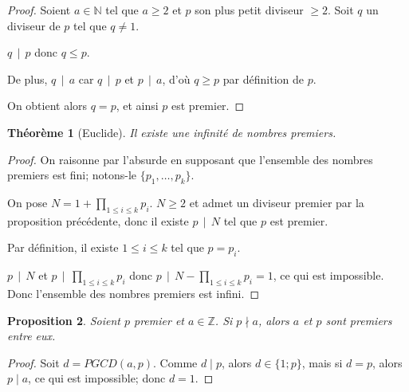 \documentclass[10pt,a4paper]{report}
\newtheorem{thm}{Théorème}[chapter]
\newtheorem*{rem}{Remarque}
\newtheorem{Prop}[thm]{Proposition}
\begin{document}
\begin{proof}
Soient $a \in \mathbb{N}$ tel que $a \geqslant 2$ et $p$ son plus petit diviseur $\geqslant 2$. Soit $q$ un diviseur de $p$ tel que $q\neq 1$.\par 
$q \, \mid \, p$ donc $q \leqslant p$. \par 
De plus, $q \, \mid \, a$ car $q \, \mid \, p$ et $p \, \mid \, a$, d'où $q \geqslant p$ par définition de $p$.\par 
On obtient alors $q=p$, et ainsi $p$ est premier.
\end{proof}

\begin{thm}[Euclide] Il existe une infinité de nombres premiers.
\end{thm}

\begin{proof}
On raisonne par l'absurde en supposant que l'ensemble des nombres premiers est fini; notons-le $\{ p_1, \ldots , p_k  \}$.\par 
On pose $N= 1+ \prod_{1 \leqslant i \leqslant k}p_i$. $N \geqslant 2$ et admet un diviseur premier par la proposition précédente, donc il existe $p \, \mid   \, N$ tel que $p$ est premier. \par 
Par définition, il existe $ 1 \leqslant i \leqslant k $ tel que $p=p_i$.\par 
$p \, \mid \, N$ et $p \, \mid \,  \prod_{1 \leqslant i \leqslant k}p_i $ donc $p \, \mid \,   N - \prod_{1 \leqslant i \leqslant k}p_i =1    $, ce qui est impossible. Donc l'ensemble des nombres premiers est infini.  
\end{proof}



\begin{Prop}
Soient $p$ premier et $a \in \mathbb{Z}$. Si $p \nmid a$, alors $a$ et $p$ sont premiers entre eux. 
\end{Prop}

\begin{proof}
Soit $d=PGCD(a,p)$. Comme $d \mid p$, alors $d \in \{ 1;p \}$, mais si $d=p$, alors $p\mid a$, ce qui est impossible; donc $d=1$.
\end{proof}
\end{document}

